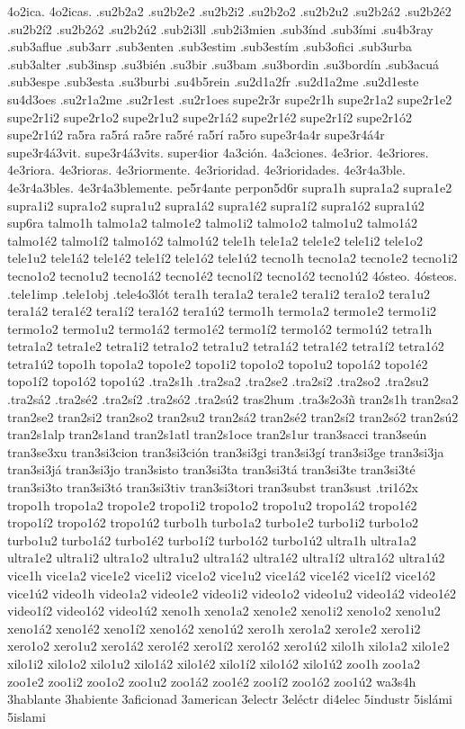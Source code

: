{4o2ica.
4o2icas.
.su2b2a2
.su2b2e2
.su2b2i2
.su2b2o2
.su2b2u2
.su2b2á2
.su2b2é2
.su2b2í2
.su2b2ó2
.su2b2ú2
.sub2i3ll
.sub2i3mien
.sub3índ
.sub3ími
.su4b3ray
.sub3aflue
.sub3arr
.sub3enten
.sub3estim
.sub3estím
.sub3ofici
.sub3urba
.sub3alter
.sub3insp
.su3bién
.su3bir
.su3bam
.su3bordin
.su3bordín
.sub3acuá
.sub3espe
.sub3esta
.su3burbi
.su4b5rein
.su2d1a2fr
.su2d1a2me
.su2d1este
su4d3oes
.su2r1a2me
.su2r1est
.su2r1oes
supe2r3r
supe2r1h
supe2r1a2 supe2r1e2 supe2r1i2 supe2r1o2 supe2r1u2
supe2r1á2 supe2r1é2 supe2r1í2 supe2r1ó2 supe2r1ú2
ra5ra
ra5rá
ra5re
ra5ré
ra5rí
ra5ro
supe3r4a4r
supe3r4á4r
supe3r4á3vit.
supe3r4á3vits.
super4ior
4a3ción.
4a3ciones.
4e3rior.
4e3riores.
4e3riora.
4e3rioras.
4e3riormente.
4e3rioridad.
4e3rioridades.
4e3r4a3ble.
4e3r4a3bles.
4e3r4a3blemente.
pe5r4ante
perpon5d6r
supra1h
supra1a2 supra1e2 supra1i2 supra1o2 supra1u2
supra1á2 supra1é2 supra1í2 supra1ó2 supra1ú2
sup6ra
talmo1h
talmo1a2 talmo1e2 talmo1i2 talmo1o2 talmo1u2
talmo1á2 talmo1é2 talmo1í2 talmo1ó2 talmo1ú2
tele1h
tele1a2 tele1e2 tele1i2 tele1o2 tele1u2
tele1á2 tele1é2 tele1í2 tele1ó2 tele1ú2
tecno1h
tecno1a2 tecno1e2 tecno1i2 tecno1o2 tecno1u2
tecno1á2 tecno1é2 tecno1í2 tecno1ó2 tecno1ú2
4ósteo.
4ósteos.
.tele1imp
.tele1obj
.tele4o3lót
tera1h
tera1a2 tera1e2 tera1i2 tera1o2 tera1u2
tera1á2 tera1é2 tera1í2 tera1ó2 tera1ú2
termo1h
termo1a2 termo1e2 termo1i2 termo1o2 termo1u2
termo1á2 termo1é2 termo1í2 termo1ó2 termo1ú2
tetra1h
tetra1a2 tetra1e2 tetra1i2 tetra1o2 tetra1u2
tetra1á2 tetra1é2 tetra1í2 tetra1ó2 tetra1ú2
topo1h
topo1a2 topo1e2 topo1i2 topo1o2 topo1u2
topo1á2 topo1é2 topo1í2 topo1ó2 topo1ú2
.tra2s1h
.tra2sa2 .tra2se2 .tra2si2 .tra2so2 .tra2su2
.tra2sá2 .tra2sé2 .tra2sí2 .tra2só2 .tra2sú2
tras2hum
.tra3s2o3ñ
tran2s1h
tran2sa2 tran2se2 tran2si2 tran2so2 tran2su2
tran2sá2 tran2sé2 tran2sí2 tran2só2 tran2sú2
tran2s1alp
tran2s1and
tran2s1atl
tran2s1oce
tran2s1ur
tran3sacci
tran3seún
tran3se3xu
tran3si3cion
tran3si3ción
tran3si3gi
tran3si3gí
tran3si3ge
tran3si3ja
tran3si3já
tran3si3jo
tran3sisto
tran3si3ta
tran3si3tá
tran3si3te
tran3si3té
tran3si3to
tran3si3tó
tran3si3tiv
tran3si3tori
tran3subst
tran3sust
.tri1ó2x
tropo1h
tropo1a2 tropo1e2 tropo1i2 tropo1o2 tropo1u2
tropo1á2 tropo1é2 tropo1í2 tropo1ó2 tropo1ú2
turbo1h
turbo1a2 turbo1e2 turbo1i2 turbo1o2 turbo1u2
turbo1á2 turbo1é2 turbo1í2 turbo1ó2 turbo1ú2
ultra1h
ultra1a2 ultra1e2 ultra1i2 ultra1o2 ultra1u2
ultra1á2 ultra1é2 ultra1í2 ultra1ó2 ultra1ú2
vice1h
vice1a2 vice1e2 vice1i2 vice1o2 vice1u2
vice1á2 vice1é2 vice1í2 vice1ó2 vice1ú2
video1h
video1a2 video1e2 video1i2 video1o2 video1u2
video1á2 video1é2 video1í2 video1ó2 video1ú2
xeno1h
xeno1a2 xeno1e2 xeno1i2 xeno1o2 xeno1u2
xeno1á2 xeno1é2 xeno1í2 xeno1ó2 xeno1ú2
xero1h
xero1a2 xero1e2 xero1i2 xero1o2 xero1u2
xero1á2 xero1é2 xero1í2 xero1ó2 xero1ú2
xilo1h
xilo1a2 xilo1e2 xilo1i2 xilo1o2 xilo1u2
xilo1á2 xilo1é2 xilo1í2 xilo1ó2 xilo1ú2
zoo1h
zoo1a2 zoo1e2 zoo1i2 zoo1o2 zoo1u2
zoo1á2 zoo1é2 zoo1í2 zoo1ó2 zoo1ú2
wa3s4h
3hablante
3habiente
3aficionad
3american
3electr
3eléctr
di4elec
5industr
5islámi
5islami
}
